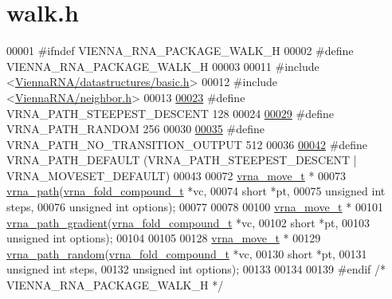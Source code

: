\hypertarget{walk_8h_source}{}\section{walk.\+h}
\label{walk_8h_source}

\begin{DoxyCode}
00001 \textcolor{preprocessor}{#ifndef VIENNA\_RNA\_PACKAGE\_WALK\_H}
00002 \textcolor{preprocessor}{#define VIENNA\_RNA\_PACKAGE\_WALK\_H}
00003 
00011 \textcolor{preprocessor}{#include <\hyperlink{datastructures_2basic_8h}{ViennaRNA/datastructures/basic.h}>}
00012 \textcolor{preprocessor}{#include <\hyperlink{neighbor_8h}{ViennaRNA/neighbor.h}>}
00013 
\hyperlink{group__paths_ga705cea2b3243a38a2d6e3b1e141ed061}{00023} \textcolor{preprocessor}{#define  VRNA\_PATH\_STEEPEST\_DESCENT 128}
00024 
\hyperlink{group__paths_ga0b84bd36bfd783130297797c51dd85ae}{00029} \textcolor{preprocessor}{#define  VRNA\_PATH\_RANDOM           256}
00030 
\hyperlink{group__paths_ga1ee63e54ecf136491e12ff03ede2622d}{00035} \textcolor{preprocessor}{#define  VRNA\_PATH\_NO\_TRANSITION\_OUTPUT          512}
00036 
\hyperlink{group__paths_gaf1bb1f8fec8d24e3b821f621b19f77b4}{00042} \textcolor{preprocessor}{#define VRNA\_PATH\_DEFAULT   (VRNA\_PATH\_STEEPEST\_DESCENT | VRNA\_MOVESET\_DEFAULT)}
00043 
00072 \hyperlink{group__neighbors_structvrna__move__s}{vrna\_move\_t} *
00073 \hyperlink{group__paths_gab6aee4143f8b103518d5cbfe6bfe5eae}{vrna\_path}(\hyperlink{group__fold__compound_structvrna__fc__s}{vrna\_fold\_compound\_t}  *vc,
00074           \textcolor{keywordtype}{short}                 *pt,
00075           \textcolor{keywordtype}{unsigned} \textcolor{keywordtype}{int}          steps,
00076           \textcolor{keywordtype}{unsigned} \textcolor{keywordtype}{int}          options);
00077 
00078 
00100 \hyperlink{group__neighbors_structvrna__move__s}{vrna\_move\_t} *
00101 \hyperlink{group__paths_gae92cce443a8a64f7b7fb89867b7d6125}{vrna\_path\_gradient}(\hyperlink{group__fold__compound_structvrna__fc__s}{vrna\_fold\_compound\_t} *vc,
00102                    \textcolor{keywordtype}{short}                *pt,
00103                    \textcolor{keywordtype}{unsigned} \textcolor{keywordtype}{int}         options);
00104 
00105 
00128 \hyperlink{group__neighbors_structvrna__move__s}{vrna\_move\_t} *
00129 \hyperlink{group__paths_ga9234756c337078fa599529d3db70d913}{vrna\_path\_random}(\hyperlink{group__fold__compound_structvrna__fc__s}{vrna\_fold\_compound\_t} *vc,
00130                  \textcolor{keywordtype}{short}                *pt,
00131                  \textcolor{keywordtype}{unsigned} \textcolor{keywordtype}{int}         steps,
00132                  \textcolor{keywordtype}{unsigned} \textcolor{keywordtype}{int}         options);
00133 
00134 
00139 \textcolor{preprocessor}{#endif }\textcolor{comment}{/* VIENNA\_RNA\_PACKAGE\_WALK\_H */}\textcolor{preprocessor}{}
\end{DoxyCode}
